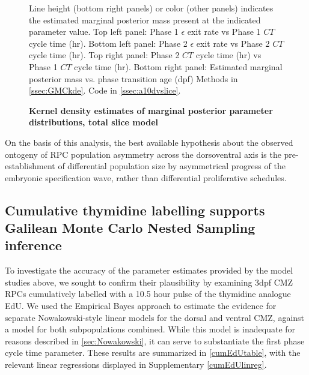 \begin{figure}[!h]
    \caption{{\bf Kernel density estimates of marginal posterior parameter distributions, total slice model}}
    Line height (bottom right panels) or color (other panels) indicates the estimated marginal posterior mass present at the indicated parameter value.
    Top left panel: Phase 1 $\epsilon$ exit rate vs Phase 1 $CT$ cycle time (hr).
    Bottom left panel: Phase 2 $\epsilon$ exit rate vs Phase 2 $CT$ cycle time (hr).
    Top right panel: Phase 2 $CT$ cycle time (hr) vs Phase 1 $CT$ cycle time (hr).
    Bottom right panel: Estimated marginal posterior mass vs. phase transition age (dpf)
    \label{dvmarginals}
    Methods in \autoref{ssec:GMCkde}.
    Code in \autoref{ssec:a10dvslice}.    
\end{figure}

On the basis of this analysis, the best available hypothesis about the observed ontogeny of RPC population asymmetry across the dorsoventral axis is the pre-establishment of differential population size by asymmetrical progress of the embryonic specification wave, rather than differential proliferative schedules.

\subsection{Cumulative thymidine labelling supports Galilean Monte Carlo Nested Sampling inference}
\label{ssec:CMZcumedu}

To investigate the accuracy of the parameter estimates provided by the model studies above, we sought to confirm their plausibility by examining 3dpf CMZ RPCs cumulatively labelled with a 10.5 hour pulse of the thymidine analogue EdU. We used the Empirical Bayes approach to estimate the evidence for separate Nowakowski-style \cite{Nowakowski1989} linear models for the dorsal and ventral CMZ, against a model for both subpopulations combined. While this model is inadequate for reasons described in \autoref{sec:Nowakowski}, it can serve to substantiate the first phase cycle time parameter. These results are summarized in \autoref{cumEdUtable}, with the relevant linear regressions displayed in Supplementary \autoref{cumEdUlinreg}.


